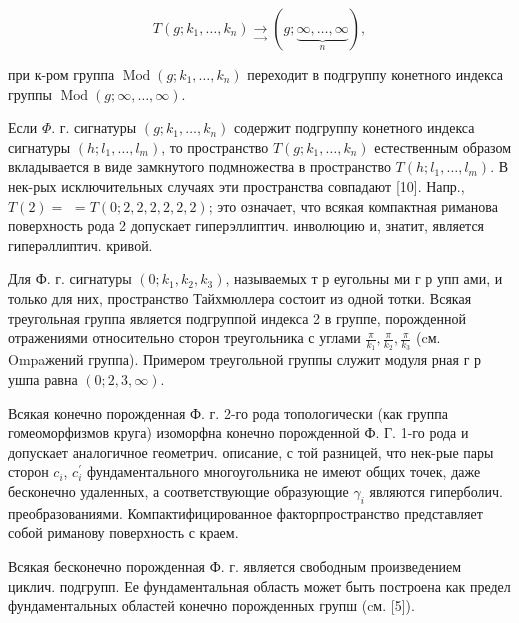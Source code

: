 \documentclass[10pt]{article}
\begin{document}
\[

T\left(g ; k_{1}, \ldots, k_{n}\right) \underset{\rightarrow}{\rightarrow}(g ; \underbrace{\infty, \ldots, \infty}_{n}),

\]



при к-ром группа $\operatorname{Mod}\left(g ; k_{1}, \ldots, k_{n}\right)$ переходит в подгруппу конетного индекса группы $\operatorname{Mod}(g ; \infty, \ldots, \infty)$.



Если $\Phi$. г. сигнатуры $\left(g ; k_{1}, \ldots, k_{n}\right)$ содержит подгруппу конетного индекса сигнатуры $\left(h ; l_{1}, \ldots, l_{m}\right)$, то пространство $T\left(g ; k_{1}, \ldots, k_{n}\right)$ естественным образом вкладывается в виде замкнутого подмножества в пространство $T\left(h ; l_{1}, \ldots, l_{m}\right)$. В нек-рых исключительных случаях эти пространства совпадают [10]. Напр., $T(2)=$ $=T(0 ; 2,2,2,2,2,2)$; это означает, что всякая компактная риманова поверхность рода 2 допускает гиперэллиптич. инволюцию и, знатит, является гиперәллиптич. кривой.



Для Ф. г. сигнатуры $\left(0 ; k_{1}, k_{2}, k_{3}\right)$, называемых т р еугольны ми г р упп ами, и только для них, пространство Тайхмюллера состоит из одной тотки. Всякая треугольная группа является подгруппой индекса 2 в группе, порожденной отражениями относительно сторон треугольника с углами $\frac{\pi}{k_{1}}, \frac{\pi}{k_{2}}, \frac{\pi}{k_{3}}$ (cм. Ompaжений группа). Примером треугольной группы служит модуля рная г р ушпа равна $(0 ; 2,3, \infty)$.



Всякая конечно порожденная Ф. г. 2-го рода топологически (как группа гомеоморфизмов круга) изоморфна конечно порожденной Ф. Г. 1-го рода и допускает аналогичное геометрич. описание, с той разницей, что нек-рые пары сторон $c_{i}$, $c_{i}^{\prime}$ фундаментального многоугольника не имеют общих точек, даже бесконечно удаленных, а соответствующие образующие $\gamma_{i}$ являются гиперболич. преобразованиями. Компактифицированное факторпространство представляет собой риманову поверхность с краем.



Всякая бесконечно порожденная Ф. г. является свободным произведением циклич. подгрупп. Ее фундаментальная область может быть построена как предел фундаментальных областей конечно порожденных групш (cм. [5]).
\end{document}

